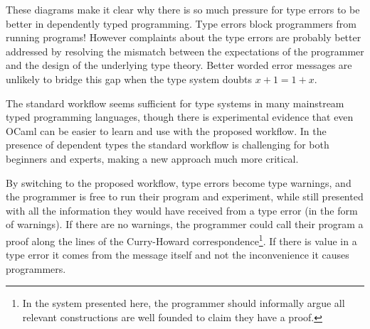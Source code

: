 These diagrams make it clear why there is so much pressure for type errors to be better in dependently typed programming. %
Type errors block programmers from running programs! However complaints about the type errors are probably better addressed by resolving the mismatch between the expectations of the programmer and the design of the underlying type theory.
Better worded error messages are unlikely to bridge this gap when the type system doubts $x+1=1+x$.

The standard workflow seems sufficient for type systems in many mainstream typed programming languages, though there is experimental evidence that even OCaml can be easier to learn and use with the proposed workflow\cite{10.1145/2951913.2951915}.
In the presence of dependent types the standard workflow is challenging for both beginners and experts, making a new approach much more critical.


By switching to the proposed workflow, type errors become type warnings, and the programmer is free to run their program and experiment, while still presented with all the information they would have received from a type error (in the form of warnings).
If there are no warnings, the programmer could call their program a proof along the lines of the Curry-Howard correspondence\footnote{
  In the system presented here, the programmer should informally argue all relevant constructions are well founded to claim they have a proof.
}.
If there is value in a type error it comes from the message itself and not the inconvenience it causes programmers.

